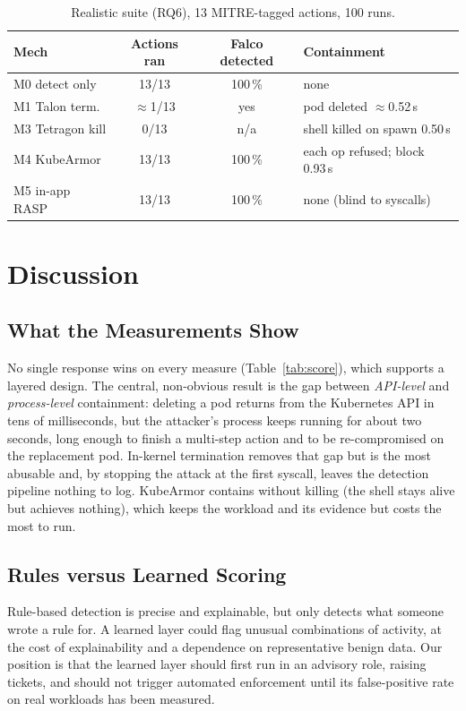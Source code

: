 \documentclass[10pt,conference]{IEEEtran}
\begin{document}
\begin{table}[t]
\caption{Realistic suite (RQ6), 13 MITRE-tagged actions, 100 runs.}
\label{tab:rq6}
\centering
\begin{tabular}{@{}lccl@{}}
\toprule
Mech & Actions ran & Falco detected & Containment\\
\midrule
M0 detect only   & 13/13 & 100\,\% & none\\
M1 Talon term.   & $\approx$1/13 & yes & pod deleted $\approx$0.52\,s\\
M3 Tetragon kill & 0/13  & n/a & shell killed on spawn 0.50\,s\\
M4 KubeArmor     & 13/13 & 100\,\% & each op refused; block 0.93\,s\\
M5 in-app RASP   & 13/13 & 100\,\% & none (blind to syscalls)\\
\bottomrule
\end{tabular}
\end{table}

\section{Discussion}\label{sec:discuss}
\subsection{What the Measurements Show}
No single response wins on every measure (Table~\ref{tab:score}), which supports a layered design. The central, non-obvious result is the gap between \emph{API-level} and \emph{process-level} containment: deleting a pod returns from the Kubernetes API in tens of milliseconds, but the attacker's process keeps running for about two seconds, long enough to finish a multi-step action and to be re-compromised on the replacement pod. In-kernel termination removes that gap but is the most abusable and, by stopping the attack at the first syscall, leaves the detection pipeline nothing to log. KubeArmor contains without killing (the shell stays alive but achieves nothing), which keeps the workload and its evidence but costs the most to run.

\subsection{Rules versus Learned Scoring}
Rule-based detection is precise and explainable, but only detects what someone wrote a rule for. A learned layer could flag unusual combinations of activity, at the cost of explainability and a dependence on representative benign data. Our position is that the learned layer should first run in an advisory role, raising tickets, and should not trigger automated enforcement until its false-positive rate on real workloads has been measured.
\end{document}
